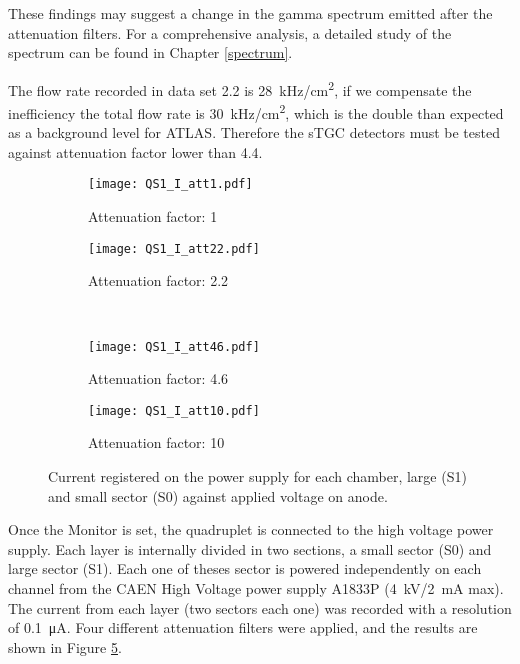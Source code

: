 These findings may suggest a change in the gamma spectrum emitted after the attenuation filters.  For a comprehensive
analysis, a detailed study of the spectrum can be found in Chapter \ref{spectrum}.\par


The flow rate recorded in data set 2.2 is \SI{28}{kHz/cm^2}, if we compensate the inefficiency the total flow rate is
\SI{30}{kHz/cm^2}, which is the double than expected as a background level for ATLAS. Therefore the sTGC detectors must
be tested against attenuation factor lower than 4.4.\par


\begin{figure}[t]
		\hspace*{\fill}
		\begin{subfigure}[b]{0.45\textwidth}
			\centering
			\texttt{[image: QS1\_I\_att1.pdf]}
			\caption{Attenuation factor: 1}\label{fig:att1}
		\end{subfigure}
		\hfill
		\begin{subfigure}[b]{0.45\textwidth}
			\centering
			\texttt{[image: QS1\_I\_att22.pdf]}
			\caption{Attenuation factor: 2.2}\label{fig:att22}
		\end{subfigure}
		\hspace*{\fill}\\
		\hspace*{\fill}
		\begin{subfigure}[b]{0.45\textwidth}
			\centering
			\texttt{[image: QS1\_I\_att46.pdf]}
			\caption{Attenuation factor: 4.6}\label{fig:att46}
		\end{subfigure}
		\hfill
		\begin{subfigure}[b]{0.45\textwidth}
			\centering
			\texttt{[image: QS1\_I\_att10.pdf]}
			\caption{Attenuation factor: 10}\label{fig:att10}
		\end{subfigure}
		\hspace*{\fill}
		\captionsetup{margin=1cm}
		\caption{Current registered on the power supply for each chamber, large (S1) and small sector (S0) against applied
		voltage on anode. }\label{gifresult}
\end{figure}

Once the Monitor is set, the quadruplet is connected to the high voltage power supply. Each layer is internally divided
in two sections, a small sector (S0) and large sector (S1). Each one of theses sector is powered independently on each
channel from the CAEN High Voltage power supply A1833P (\SI{4}{kV}/\SI{2}{mA} max). The current from each layer (two sectors
each one)	was recorded with a resolution of \SI{0.1}{\micro A}. Four different attenuation filters were applied, and the
results are shown in Figure \ref{gifresult}. 

